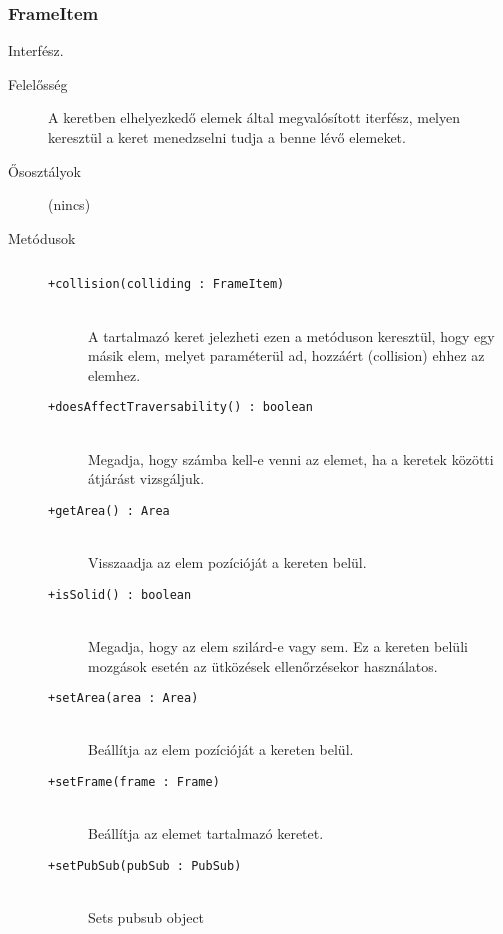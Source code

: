 		\subsubsection{FrameItem} Interfész.
			\begin{description}

				\item[Felelősség] A keretben elhelyezkedő elemek által megvalósított iterfész, melyen keresztül a keret menedzselni tudja a benne lévő elemeket.

				\item[Ősosztályok] (nincs)
				\item[Metódusok]$\ $
					\begin{description}
						\item[\texttt{+collision(colliding : FrameItem)}] \hfill \\A tartalmazó keret jelezheti ezen a metóduson keresztül,  hogy egy másik elem, melyet paraméterül ad,  hozzáért (collision) ehhez az elemhez. 
						\item[\texttt{+doesAffectTraversability() : boolean}] \hfill \\Megadja, hogy számba kell-e venni az elemet,  ha a keretek közötti átjárást vizsgáljuk. 
						\item[\texttt{+getArea() : Area}] \hfill \\Visszaadja az elem pozícióját a kereten belül. 
						\item[\texttt{+isSolid() : boolean}] \hfill \\Megadja, hogy az elem szilárd-e vagy sem.  Ez a kereten belüli mozgások esetén az  ütközések ellenőrzésekor használatos. 
						\item[\texttt{+setArea(area : Area)}] \hfill \\Beállítja az elem pozícióját a kereten belül. 
						\item[\texttt{+setFrame(frame : Frame)}] \hfill \\Beállítja az elemet tartalmazó keretet. 
						\item[\texttt{+setPubSub(pubSub : PubSub)}] \hfill \\Sets pubsub object 
					\end{description}
			\end{description}


